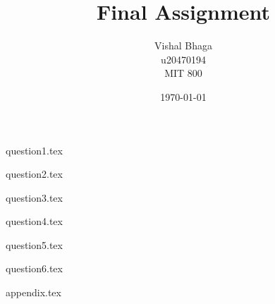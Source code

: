 \documentclass[12pt,a4paper]{article}
\title{Final Assignment}
\author{
    Vishal Bhaga\\
    u20470194\\
    MIT 800
}
\date{\today}
\begin{document}


\newpage

{question1.tex}

{question2.tex}

{question3.tex}

{question4.tex}

{question5.tex}

{question6.tex}

\newpage

{appendix.tex}
\end{document}
